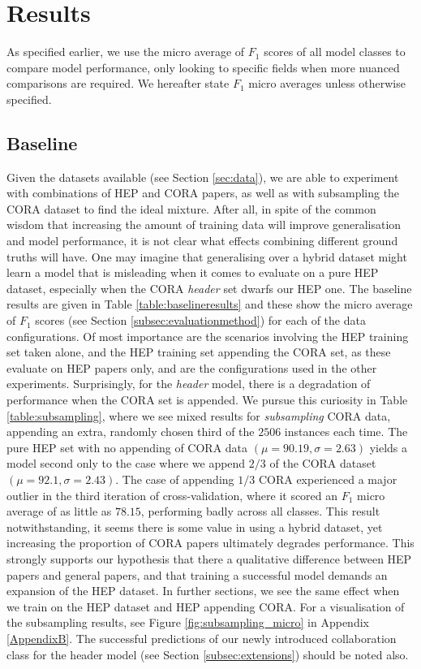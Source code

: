 \section{Results}
\label{sec:results}

As specified earlier, we use the micro average of $F_1$ scores of all model classes to compare model performance, only looking to specific fields when more nuanced comparisons are required. We hereafter state $F_1$ micro averages unless otherwise specified.

\subsection{Baseline}
\label{subsec:baslineresults}

Given the datasets available (see Section \ref{sec:data}), we are able to experiment with combinations of HEP and CORA papers, as well as with subsampling the CORA dataset to find the ideal mixture. After all, in spite of the common wisdom that increasing the amount of training data will improve generalisation and model performance, it is not clear what effects combining different ground truths will have. One may imagine that generalising over a hybrid dataset might learn a model that is misleading when it comes to evaluate on a pure HEP dataset, especially when the CORA \emph{header} set dwarfs our HEP one. The baseline results are given in Table \ref{table:baselineresults} and these show the micro average of $F_1$ scores (see Section \ref{subsec:evaluationmethod}) for each of the data configurations. Of most importance are the scenarios involving the HEP training set taken alone, and the HEP training set appending the CORA set, as these evaluate on HEP papers only, and are the configurations used in the other experiments. Surprisingly, for the \emph{header} model, there is a degradation of performance when the CORA set is appended. We pursue this curiosity in Table \ref{table:subsampling}, where we see mixed results for \emph{subsampling} CORA data, appending an extra, randomly chosen third of the $2506$ instances each time. The pure HEP set with no appending of CORA data $(\mu = 90.19, \sigma = 2.63)$ yields a model second only to the case where we append $2/3$ of the CORA dataset $(\mu = 92.1, \sigma = 2.43)$. The case of appending $1/3$ CORA experienced a major outlier in the third iteration of cross-validation, where it scored an $F_1$ micro average of as little as $78.15$, performing badly across all classes. This result notwithstanding, it seems there is some value in using a hybrid dataset, yet increasing the proportion of CORA papers ultimately degrades performance. This strongly supports our hypothesis that there a qualitative difference between HEP papers and general papers, and that training a successful model demands an expansion of the HEP dataset. In further sections, we see the same effect when we train on the HEP dataset and HEP appending CORA. For a visualisation of the subsampling results, see Figure \ref{fig:subsampling_micro} in Appendix \ref{AppendixB}. The successful predictions of our newly introduced collaboration class for the header model (see Section \ref{subsec:extensions}) should be noted also.

